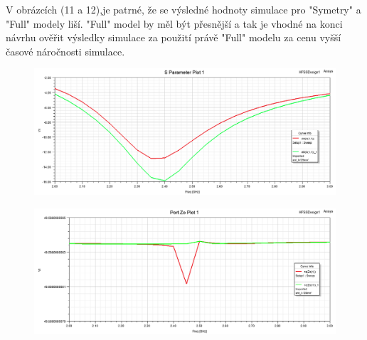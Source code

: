 \documentclass[10pt, a4paper]{article}%
\begin{document}
V obrázcích (11 a 12),je patrné, že se výsledné hodnoty simulace pro "Symetry" a "Full" modely liší.
"Full" model by měl být přesnější a tak je vhodné na konci návrhu ověřit výsledky simulace za použití
právě "Full" modelu za cenu vyšší časové náročnosti simulace.

\begin{figure}[ht!]
	\centering
	\includegraphics[height = 0.26\textheight,width = 1\textwidth]{S11_compare.png}
\end{figure}
\clearpage

\begin{figure}[ht!]
	\centering
	\includegraphics[height = 0.26\textheight,width = 1\textwidth]{Z0_compare.png}
\end{figure}
\end{document}
